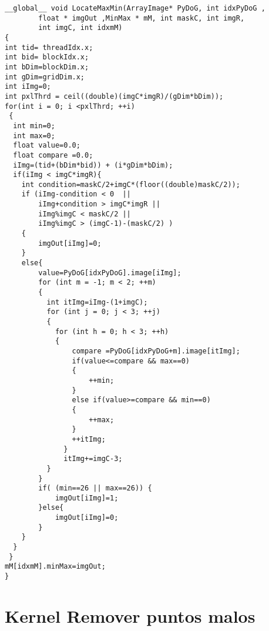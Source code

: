 \begin{small}
\begin{lstlisting}
__global__ void LocateMaxMin(ArrayImage* PyDoG, int idxPyDoG ,
		float * imgOut ,MinMax * mM, int maskC, int imgR,
		int imgC, int idxmM)
{
int tid= threadIdx.x;
int bid= blockIdx.x;
int bDim=blockDim.x;
int gDim=gridDim.x;
int iImg=0;
int pxlThrd = ceil((double)(imgC*imgR)/(gDim*bDim)); 
for(int i = 0; i <pxlThrd; ++i)
 {
  int min=0;
  int max=0;
  float value=0.0;
  float compare =0.0;
  iImg=(tid+(bDim*bid)) + (i*gDim*bDim); 
  if(iImg < imgC*imgR){
	int condition=maskC/2+imgC*(floor((double)maskC/2));
	if (iImg-condition < 0  ||										
		iImg+condition > imgC*imgR ||								
		iImg%imgC < maskC/2 ||										
		iImg%imgC > (imgC-1)-(maskC/2) )							
	{                  
		imgOut[iImg]=0;				
	}
	else{
		value=PyDoG[idxPyDoG].image[iImg];
		for (int m = -1; m < 2; ++m)
		{
		  int itImg=iImg-(1+imgC);
		  for (int j = 0; j < 3; ++j)
		  {		
		    for (int h = 0; h < 3; ++h)
			{
				compare =PyDoG[idxPyDoG+m].image[itImg];
				if(value<=compare && max==0)
				{
					++min;
				}
				else if(value>=compare && min==0)
				{
					++max;
				}
				++itImg;
			  }
			  itImg+=imgC-3;
		  }
		}
 		if( (min==26 || max==26)) {
			imgOut[iImg]=1;
		}else{
			imgOut[iImg]=0;
		}
	}
  }
 }
mM[idxmM].minMax=imgOut;
}
\end{lstlisting}

\end{small}
\pagebreak
\chapter{Kernel Remover puntos malos}

